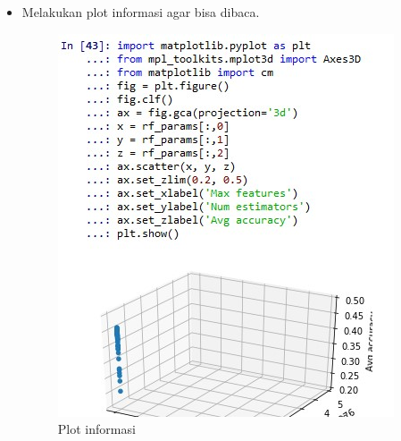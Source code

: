 \begin{enumerate}
\begin{itemize}
\begin{figure}[!hbtp]
			\label{contoh}
			\end{figure}
		\item Melakukan plot informasi agar bisa dibaca.
			\begin{figure}[!hbtp]
			\centering
			\includegraphics[scale=0.5]{figures/k82.jpg}
			\caption{Plot informasi}
			\label{contoh}
			\end{figure}
	\end{itemize}
\end{enumerate}

